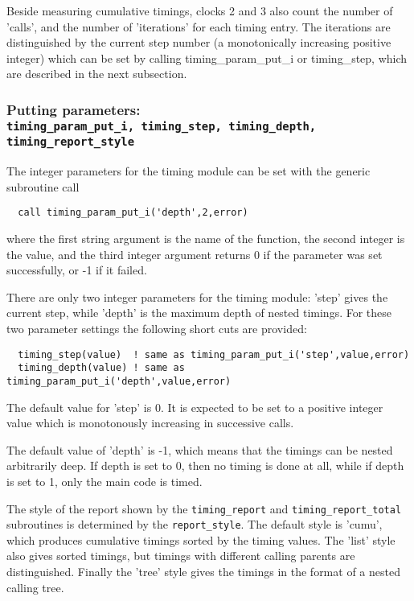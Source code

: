 Beside measuring cumulative timings, clocks 2 and 3 also count the number 
of 'calls', and the number of 'iterations' for each timing entry. 
The iterations are distinguished by the current step number 
(a monotonically increasing positive integer) which can be set by calling
timing\_param\_put\_i or timing\_step, which are
described in the next subsection.

\subsubsection{Putting parameters: \\
{\tt timing\_param\_put\_i, timing\_step, timing\_depth, 
timing\_report\_style}}

The integer parameters for the timing module can be set with the generic
subroutine call
\begin{verbatim}
  call timing_param_put_i('depth',2,error)
\end{verbatim}
where the first string argument is the name of the function,
the second integer is the value, and the third integer argument
returns 0 if the parameter was set successfully, or -1 if it failed.

There are only two integer parameters for the timing module:
'step' gives the current step, while 'depth' is the maximum
depth of nested timings. For these two parameter settings the 
following short cuts are provided:
{\small
\begin{verbatim}
  timing_step(value)  ! same as timing_param_put_i('step',value,error)
  timing_depth(value) ! same as timing_param_put_i('depth',value,error)
\end{verbatim}
}
The default value for 'step' is 0. It is expected to be set to
a positive integer value which is monotonously increasing in
successive calls.

The default value of 'depth' is -1, which 
means that the timings can be nested arbitrarily deep. 
If depth is set to 0, then no timing is done at all, while
if depth is set to 1, only the main code is timed.

The style of the report shown by the 
{\tt timing\_report} and  {\tt timing\_report\_total} subroutines
is determined by the {\tt report\_style}. The default style is
'cumu', which produces cumulative timings sorted by the timing values.
The 'list' style also gives sorted timings, but timings with different calling
parents are distinguished. Finally the 'tree' style gives the timings
in the format of a nested calling tree.

